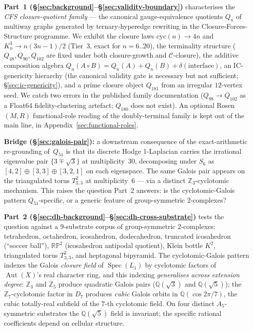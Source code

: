 \documentclass[12pt,a4paper]{article}
\theoremstyle{definition}
\theoremstyle{remark}
\newcommand{\bZ}{\mathbb{Z}}
\newcommand{\bQ}{\mathbb{Q}}                %
\DeclareMathOperator{\Aut}{Aut}
\DeclareMathOperator{\Spec}{Spec}
\newcommand{\Kn}{K_n^3}
\newcommand{\Qn}{Q_n}
\newcommand{\Ccls}{\mathcal{C}}             %
\newcommand{\cyc}{\mathrm{cyc}}
\begin{document}
\medskip\noindent
\textbf{Part~1 (\S\ref{sec:background}--\S\ref{sec:validity-boundary})}
characterises the \emph{CFS closure-quotient family} --- the canonical
gauge-equivalence quotients $\Qn$ of multiway graphs generated by
ternary-hyperedge rewriting in the Closure-Forces-Structure programme.
We exhibit the closure laws $\cyc(n) \to 4n$ and $\Kn \to n(3n{-}1)/2$
(Tier~3, exact for $n=6..20$), the terminality structure
($Q_{48}, Q_{90}, Q_{102}$ are fixed under both closure-growth and
$\Ccls$-closure), the additive composition algebra
$\Qn(A \circ B) = \Qn(A) + \Qn(B) + \delta(\mathrm{interface})$, an
IC-genericity hierarchy (the canonical validity gate is necessary but
not sufficient; \S\ref{sec:ic-genericity}), and a prime closure object
$Q_{181}$ from an irregular $12$-vertex seed. We catch two errors in the
published family documentation ($Q_{98} \to Q_{102}$ as a Float64
fidelity-clustering artefact; $Q_{180}$ does not exist). An optional
Rosen $(M, R)$ functional-role reading of the doubly-terminal family is
kept out of the main line, in Appendix~\ref{sec:functional-roles}.

\medskip\noindent
\textbf{Bridge (\S\ref{sec:galois-pair}):} a downstream consequence of
the exact-arithmetic re-grounding of~$Q_{51}$ is that its discrete Hodge
1-Laplacian carries the irrational eigenvalue pair $\{3 \mp \sqrt 3\}$ at
multiplicity~$30$, decomposing under $S_6$ as $[4,2] \oplus [3,3] \oplus
[3,2,1]$ on each eigenspace. The same Galois pair appears on the
triangulated torus $T^2_{3,3}$ at multiplicity~$6$ --- via a distinct
$\bZ_3$-cyclotomic mechanism. This raises the question Part~2 answers:
is the cyclotomic-Galois pattern $Q_{51}$-specific, or a generic feature of
group-symmetric 2-complexes?

\medskip\noindent
\textbf{Part~2 (\S\ref{sec:dh-background}--\S\ref{sec:dh-cross-substrate})}
tests the question against a 9-substrate corpus of group-symmetric
$2$-complexes: tetrahedron, octahedron, icosahedron, dodecahedron, truncated
icosahedron (``soccer ball''), $\mathbb{RP}^2$ (icosahedron antipodal
quotient), Klein bottle $K^2$, triangulated torus $T^2_{3,3}$, and
heptagonal bipyramid. The cyclotomic-Galois pattern indexes the Galois
\emph{closure field} of $\Spec(L_1)$ by cyclotomic factors of $\Aut(X)$'s
real character ring, and this indexing \emph{generalises across extension
degree}: $\bZ_3$ and $\bZ_5$ produce quadratic Galois pairs ($\bQ(\sqrt 3)$
and $\bQ(\sqrt 5)$); the $\bZ_7$-cyclotomic factor in $D_7$ produces
\emph{cubic} Galois orbits in $\bQ(\cos 2\pi/7)$, the cubic totally-real
subfield of the $7$-th cyclotomic field. On four distinct
$A_5$-symmetric substrates the $\bQ(\sqrt 5)$ field is invariant; the
specific rational coefficients depend on cellular structure.
\end{document}
